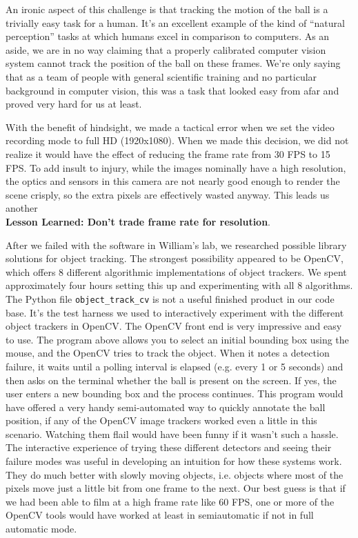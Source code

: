 \documentclass{article}
\begin{document}
An ironic aspect of this challenge is that tracking the motion of the ball is a trivially easy task for a human.  
It's an excellent example of the kind of ``natural perception'' tasks at which humans excel in comparison to computers.
As an aside, we are in no way claiming that a properly calibrated 
computer vision system cannot track the position of the ball on these frames.
We're only saying that as a team of people with general scientific training and no
particular background in computer vision, this was a task that looked easy from afar
and proved very hard for us at least.

With the benefit of hindsight, we made a tactical error when we 
set the video recording mode to full HD (1920x1080).  
When we made this decision, we did not realize it would have the effect of
reducing the frame rate from 30 FPS to 15 FPS.  
To add insult to injury, while the images nominally have a high resolution,
the optics and sensors in this camera are not nearly good enough to render 
the scene crisply, so the extra pixels are effectively wasted anyway.
This leads us another\\
\textbf{Lesson Learned: Don't trade frame rate for resolution}.

After we failed with the software in William's lab, we researched possible library
solutions for object tracking.  The strongest possibility appeared to be OpenCV,
which offers 8 different algorithmic implementations of object trackers.
We spent approximately four hours setting this up and experimenting with all 8 algorithms.  
The Python file \texttt{object\_track\_cv} is not a useful finished product in our code base.
It's the test harness we used to interactively experiment with 
the different object trackers in OpenCV.  
The OpenCV front end is very impressive and easy to use.  
The program above allows you to select an initial bounding box using the mouse,
and the OpenCV tries to track the object.  
When it notes a detection failure, it waits until a polling interval is elapsed 
(e.g. every 1 or 5 seconds) and then asks on the terminal 
whether the ball is present on the screen.  
If yes, the user enters a new bounding box and the process continues.
This program would have offered a very handy semi-automated way to quickly
annotate the ball position, if any of the OpenCV image trackers 
worked even a little in this scenario.  
Watching them flail would have been funny if it wasn't such a hassle.
The interactive experience of trying these different detectors and seeing their
failure modes was useful in developing an intuition for how these systems work.
They do much better with slowly moving objects, i.e. objects 
where most of the pixels move just a little bit from one frame to the next.
Our best guess is that if we had been able to film at a high frame rate like 60 FPS,
one or more of the OpenCV tools would have worked at least in semiautomatic
if not in full automatic mode.
\end{document}
